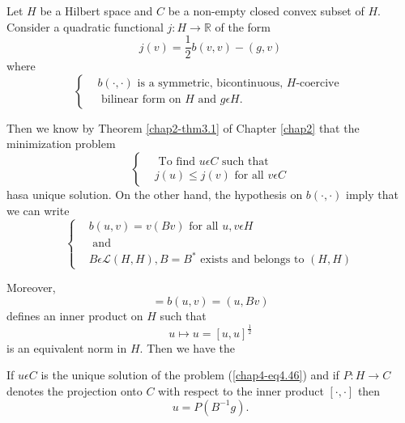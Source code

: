\medskip
{} Let $H$ be a Hilbert space and $C$ be a non-empty closed convex subset of $H$. Consider a quadratic functional $j : H \to \mathbb{R}$ of the form 
\begin{equation*}
j(v) = \frac{1}{2} b(v, v) - (g, v)\tag{4.44}\label{chap4-eq4.44}
\end{equation*}
where
\begin{equation*}
\begin{cases}
& b(\cdot , \cdot) \text{ is a symmetric, bicontinuous, $H$-coercive }\\
& \text{ bilinear form on $H$ and } g \epsilon H.
\end{cases} \tag{4.45}\label{chap4-eq4.45}
\end{equation*}

Then we know by Theorem \ref{chap2-thm3.1} of Chapter \ref{chap2} that the minimization problem
\begin{equation*}
\begin{cases}
& \text{ To find } u \epsilon C \text{ such that }\\
& j(u) \leq j(v) \text{ for all } v \epsilon C\tag{4.46}\label{chap4-eq4.46}
\end{cases}
\end{equation*}
has\pageoriginale a unique solution. On the other hand, the hypothesis on $b(\cdot , \cdot)$ imply that we can write
\begin{equation*}
\begin{cases}
& b(u, v) = v(Bv) \text{ for all } u, v \epsilon H\\
& \text{ and }\\
& B \epsilon \mathscr{L} (H, H), B = B^{*} \text{ exists and belongs to } (H, H)
\end{cases}
\end{equation*}

Moreover,
\begin{equation*}
[u, v] = b(u, v) = (u, Bv)\tag{4.48}\label{chap4-eq4.48}
\end{equation*}
defines an inner product on $H$ such that
\begin{equation*}
u \mapsto u = [u, u]^{\frac{1}{2}}\tag{4.49}\label{chap4-eq4.49}
\end{equation*}
is an equivalent norm in $H$. Then we have the

\begin{lemma}\label{chap4-lem4.1}
If $u \epsilon C$ is the unique solution of the problem (\ref{chap4-eq4.46}) and if $P : H \to C$ denotes the projection onto $C$ with respect to the inner product $[\cdot , \cdot]$ then
\begin{equation*}
u = P(B^{-1} g).\tag{4.50}\label{chap4-eq4.50}
\end{equation*}
\end{lemma}

